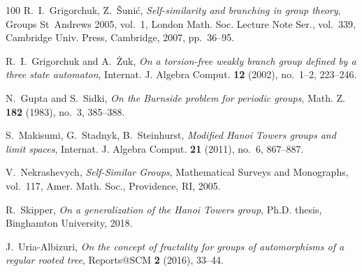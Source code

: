 \documentclass[11pt,leqno]{amsart}
\theoremstyle{plain}
\numberwithin{equation}{section}
\begin{document}
\begin{thebibliography}{100}
R.~I.~Grigorchuk, Z.~\v{S}uni\'c,
\emph{Self-similarity and branching in group theory},
Groups St~Andrews 2005, vol.~1, London Math. Soc. Lecture Note Ser., vol.~339,
Cambridge Univ. Press, Cambridge, 2007, pp.~36--95.

R.~I.~Grigorchuk and A.~\.{Z}uk,
\emph{On a torsion-free weakly branch group defined by a three state automaton},
Internat. J. Algebra Comput. \textbf{12} (2002), no.~1--2, 223--246.

N.~Gupta and S.~Sidki,
\emph{On the Burnside problem for periodic groups},
Math. Z. \textbf{182} (1983), no.~3, 385--388.

S.~Makisumi, G.~Stadnyk, B.~Steinhurst,
\emph{Modified Hanoi Towers groups and limit spaces},
Internat. J. Algebra Comput. \textbf{21} (2011), no.~6, 867--887.

V.~Nekrashevych,
\emph{Self-Similar Groups},
Mathematical Surveys and Monographs, vol.~117, Amer. Math. Soc., Providence, RI, 2005.

R.~Skipper,
\emph{On a generalization of the Hanoi Towers group},
Ph.D. thesis, Binghamton University, 2018.

J.~Uria-Albizuri,
\emph{On the concept of fractality for groups of automorphisms of a regular rooted tree},
Reports@SCM \textbf{2} (2016), 33--44.



\end{thebibliography}
\end{document}
